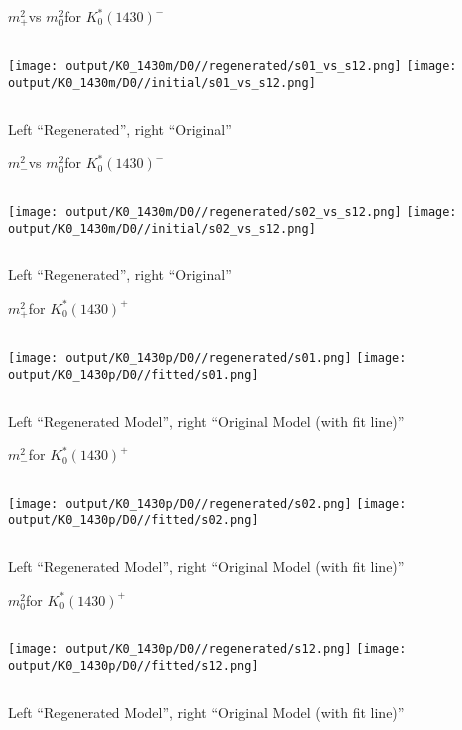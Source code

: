 \documentclass{beamer}
\newcommand{\MP}{\ensuremath{m^2_+}}
\newcommand{\MM}{\ensuremath{m^2_-}}
\newcommand{\MZ}{\ensuremath{m^2_0}}
\begin{document}
\begin{frame}{\MP vs \MZ for $K_0^*(1430)^-$}
\begin{columns}[t]
\centering
\texttt{[image: output/K0\_1430m/D0//regenerated/s01\_vs\_s12.png]}
\centering
\texttt{[image: output/K0\_1430m/D0//initial/s01\_vs\_s12.png]}
\end{columns}
    \centering
    Left ``Regenerated'', right ``Original''
\end{frame} 


\begin{frame}{\MM vs \MZ for $K_0^*(1430)^-$}
\begin{columns}[t]
\centering
\texttt{[image: output/K0\_1430m/D0//regenerated/s02\_vs\_s12.png]}
\centering
\texttt{[image: output/K0\_1430m/D0//initial/s02\_vs\_s12.png]}
\end{columns}
    \centering
    Left ``Regenerated'', right ``Original''
\end{frame} 

\begin{frame}{\MP for $K_0^*(1430)^+$}
\begin{columns}[t]
\centering
\texttt{[image: output/K0\_1430p/D0//regenerated/s01.png]}
\centering
\texttt{[image: output/K0\_1430p/D0//fitted/s01.png]}
\end{columns}
    \centering
    Left ``Regenerated Model'', right ``Original Model (with fit line)''
\end{frame}                   

\begin{frame}{\MM for $K_0^*(1430)^+$}
\begin{columns}[t]
\centering
\texttt{[image: output/K0\_1430p/D0//regenerated/s02.png]}
\centering
\texttt{[image: output/K0\_1430p/D0//fitted/s02.png]}
\end{columns}
    \centering
    Left ``Regenerated Model'', right ``Original Model (with fit line)''
\end{frame}                   

\begin{frame}{\MZ for $K_0^*(1430)^+$}
\begin{columns}[t]
\centering
\texttt{[image: output/K0\_1430p/D0//regenerated/s12.png]}
\centering
\texttt{[image: output/K0\_1430p/D0//fitted/s12.png]}
\end{columns}
    \centering
    Left ``Regenerated Model'', right ``Original Model (with fit line)''
\end{frame}                   
\end{document}
